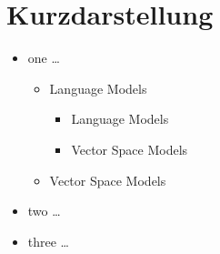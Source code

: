 \chapter*{Kurzdarstellung}


\begin{itemize} 
\item one \dots{}
     \begin{itemize} 
        \item Language Models
        \begin{itemize} 
        \item Language Models
        \item Vector Space Models
     \end{itemize}
        \item Vector Space Models
     \end{itemize}
\item two \dots{}
\item three \dots{}
\end{itemize}